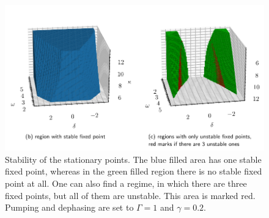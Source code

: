 \begin{figure}[H]
    \hspace*{-1.2cm}
    \includegraphics{pictures/stability_regions_2plots.pdf}
    \caption{Stability of the stationary points. The blue filled area has one stable fixed point, whereas in the green filled region there is no stable fixed point at all. One can also find a regime, in which there are three fixed points, but all of them are unstable. This area is marked red. Pumping and dephasing are set to $\Gamma=1$ and $\gamma=0.2$.}
    \label{fig:stability_of_solutions}
\end{figure}

